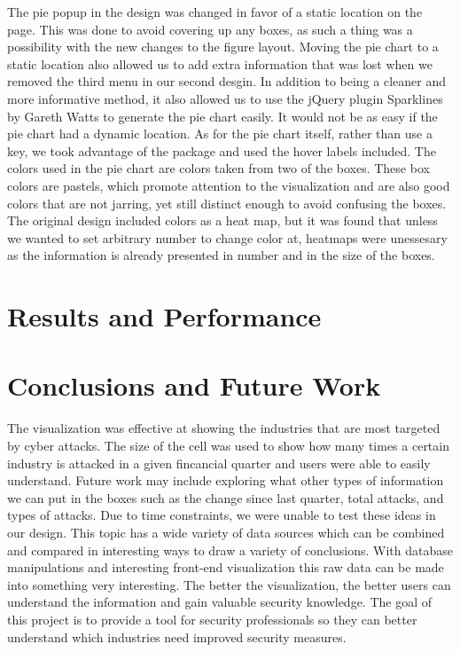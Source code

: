 \documentclass[journal]{vgtc}                %
\begin{document}
The pie popup in the design was changed in favor of a static location on the page. This was done to avoid covering up any 
boxes, as such a thing was a possibility with the new changes to the figure layout. Moving the pie chart to a static 
location also allowed us to add extra information that was lost when we removed the third menu in our second desgin. In 
addition to being a cleaner and more informative method, it also allowed us to use the jQuery plugin Sparklines by Gareth Watts to 
generate the pie chart easily. It would not be as easy if the pie chart had a dynamic location. As for the pie chart itself,
rather than use a key, we took advantage of the package and used the hover labels included. The colors used in the pie chart
are colors taken from two of the boxes. These box colors are pastels, which promote attention to the visualization and are 
also good colors that are not jarring, yet still distinct enough to avoid confusing the boxes. The original design included
colors as a heat map, but it was found that unless we wanted to set arbitrary number to change color at, heatmaps were 
unessesary as the information is already presented in number and in the size of the boxes.

\section{Results and Performance}

\section{Conclusions and Future Work}
The visualization was effective at showing the industries that are most targeted by cyber attacks. 
The size of the cell was used to show how many times a certain industry is attacked in a given fincancial quarter and users were able to easily understand.
Future work may include exploring what other types of information we can put in the boxes such as the change since last quarter, total attacks, and types of attacks. 
Due to time constraints, we were unable to test these ideas in our design.
This topic has a wide variety of data sources which can be combined and compared in interesting ways to draw a variety of conclusions.
With database manipulations and interesting front-end visualization this raw data can be made into something very interesting.
The better the visualization, the better users can understand the information and gain valuable security knowledge.
The goal of this project is to provide a tool for security professionals so they can better understand which industries need improved security measures. 

%

%
%
%


\end{document}
